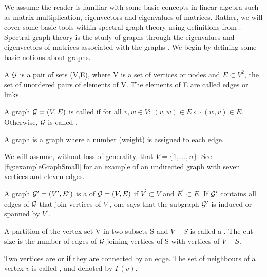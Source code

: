 We assume the reader is familiar with some basic concepts in linear algebra such as matrix multiplication, eigenvectors and eigenvalues of matrices. Rather, we will cover some basic tools within spectral graph theory using definitions from \cite{For10,New06a, Spi12, Spi07}. Spectral graph theory is the study of graphs through the eigenvalues and eigenvectors of matrices associated with the graphs \cite{Spi12}. We begin by defining some basic notions about graphs.
\begin{definition}
	\label{def:graph}
	A  $\mathcal G$ is a pair of sets (V,E), where V is a set of vertices or nodes and $E \subset V^{2}$, the set of unordered pairs of elements of V. The elements of E are called edges or links.
\end{definition}
\begin{definition}
	\label{def:undirectedGraph}
	A graph $\mathcal G = (V,E)$ is called  if for all $v,w \in V$: $(v,w) \in E \iff (w,v) \in E$. Otherwise, $\mathcal G$ is called .
\end{definition}
\begin{definition}
	\label{def:weightedGraph}
	A  graph is a graph where a number (weight) is assigned to each edge.
\end{definition}
We will assume, without loss of generality, that $V = \{1,\dots,n\}$. See \cref{fig:exampleGraphSmall} for an example of an undirected graph with seven vertices and eleven edges.
\begin{definition}
	\label{def:subGraph}
	A graph $\mathcal G^{\prime} = (V^{\prime},E^{\prime})$ is a  of $\mathcal G = (V,E)$ if $V^{\prime} \subset V$ and $E^{\prime} \subset E$. If $\mathcal G^{\prime}$ contains all edges of $\mathcal G$ that join vertices of $V^{\prime}$, one says that the subgraph $\mathcal G^{\prime}$ is induced or spanned by $V^{\prime}$.
\end{definition}
\begin{definition}
	\label{def:cuts}
	A partition of the vertex set V in two subsets S and $V-S$ is called a . The cut size is the number of edges of $\mathcal G$ joining vertices of S with vertices of $V-S$.
\end{definition}
\begin{definition}
	\label{def:neighbourhoodNode}
	Two vertices are  or  if they are connected by an edge. The set of neighbours of a vertex $v$ is called , and denoted by $\Gamma(v)$.
\end{definition}
